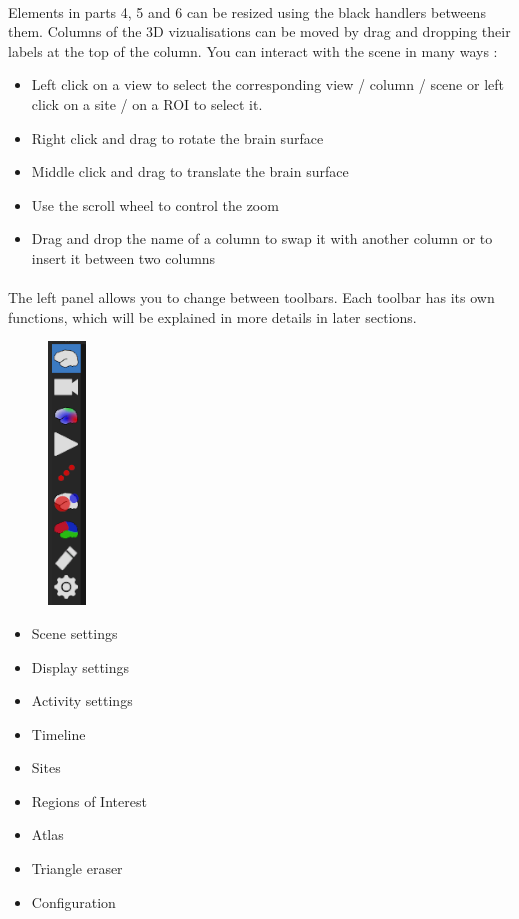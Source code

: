 \documentclass[a4paper]{article}
\begin{document}
\paragraph{} Elements in parts 4, 5 and 6 can be resized using the black handlers betweens them. Columns of the 3D vizualisations can be moved by drag and dropping their labels at the top of the column. You can interact with the scene in many ways :
\begin{itemize}
\item Left click on a view to select the corresponding view / column / scene or left click on a site / on a ROI to select it.
\item Right click and drag to rotate the brain surface
\item Middle click and drag to translate the brain surface
\item Use the scroll wheel to control the zoom
\item Drag and drop the name of a column to swap it with another column or to insert it between two columns
\end{itemize}
\paragraph{} The left panel allows you to change between toolbars. Each toolbar has its own functions, which will be explained in more details in later sections.
\newline
\begin{minipage}{0.3\textwidth}
\begin{figure}[H]
\begin{center}
\includegraphics[scale=0.89]{ToolbarSelector.png}
\end{center}
\end{figure}
\end{minipage}
\begin{minipage}{0.5\textwidth}
\begin{itemize}
\item Scene settings
\item Display settings
\item Activity settings
\item Timeline
\item Sites
\item Regions of Interest
\item Atlas
\item Triangle eraser
\item Configuration
\end{itemize}
\end{minipage}
\end{document}
